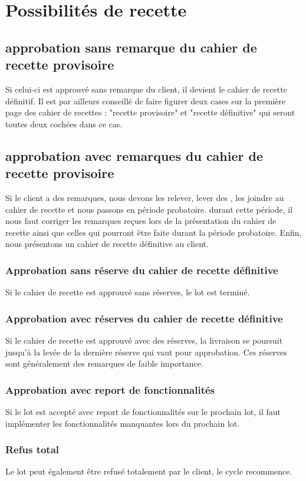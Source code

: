\documentclass [a4paper] {article}
\begin{document}
\section{Possibilités de recette}
\subsection{approbation sans remarque du cahier de recette provisoire}
Si celui-ci est approuvé sans remarque du client, il devient le cahier de recette définitif. Il est par ailleurs conseillé de faire figurer deux cases sur la première page des cahier de recettes : "recette provisoire" et "recette définitive" qui seront toutes deux cochées dans ce cas.

\subsection{approbation avec remarques du cahier de recette provisoire}
Si le client a des remarques, nous devons les relever, lever des \FFT{}, les joindre au cahier de recette et nous passons en période probatoire. durant cette période, il nous faut corriger les remarques reçues lors de la présentation du cahier de recette ainsi que celles qui pourront être faite durant la période probatoire. Enfin, nous présentons un cahier de recette définitive au client.
\subsubsection{Approbation sans réserve du cahier de recette définitive}
Si le cahier de recette est approuvé sans réserves, le lot est terminé.
\subsubsection{Approbation avec réserves du cahier de recette définitive}
Si le cahier de recette est approuvé avec des réserves, la livraison se poursuit jusqu'à la levée de la dernière réserve qui vaut pour approbation. Ces réserves sont généralement des remarques de faible importance.
\subsubsection{Approbation avec report de fonctionnalités}
Si le lot est accepté avec report de fonctionnalités sur le prochain lot, il faut implémenter les fonctionnalités manquantes lors du prochain lot.
\subsubsection{Refus total}
Le lot peut également être refusé totalement par le client, le cycle recommence.
\end{document}
